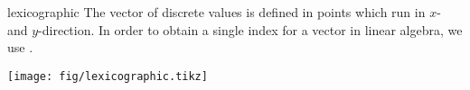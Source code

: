 \begin{Definition}{lexicographic}
  The vector of discrete values is defined in points which run in $x$-
  and $y$-direction. In order to obtain a single index for a vector in
  linear algebra, we use .
  \begin{center}
    \texttt{[image: fig/lexicographic.tikz]}
  \end{center}  
\end{Definition}

